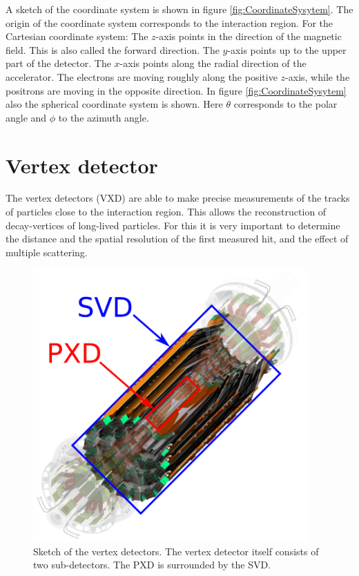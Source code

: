 \documentclass[a4paper,11pt,twosided,final,german,openbib,pdftex,listof=totoc,bibliography=totoc]{scrbook}
\begin{document}
A sketch of the coordinate system is shown in figure \ref{fig:CoordinateSysytem}. The origin of the coordinate system corresponds to the interaction region. For the Cartesian coordinate system: The $z$-axis points in the direction of the magnetic field. This is also called the forward direction. The $y$-axis points up to the upper part of the detector. The $x$-axis points along the radial direction of the accelerator. The electrons are moving roughly along the positive $z$-axis, while the positrons are moving in the opposite direction. In figure \ref{fig:CoordinateSysytem} also the spherical coordinate system is shown. Here $\theta$ corresponds to the polar angle and $\phi$ to the azimuth angle.\cite{DevelopVertex}

\section{Vertex detector}
\label{sec:vertexDet}

The vertex detectors (VXD) are able to make precise measurements of the tracks of particles close to the interaction region. This allows the reconstruction of decay-vertices of long-lived particles. For this it is very important to determine the distance and the spatial resolution of the first measured hit, and the effect of multiple scattering.


\begin{figure}[h!]
	\begin{center}
		\includegraphics[width=10.5cm]{Bilder/PXD_SVD}
	\end{center}
\caption[Vertex Detector]{Sketch of the vertex detectors. The vertex detector itself consists of two sub-detectors. The PXD is surrounded by the SVD. \cite{OnlineDataReduction} }
\label{fig:VertexDet}
\end{figure}
\end{document}
